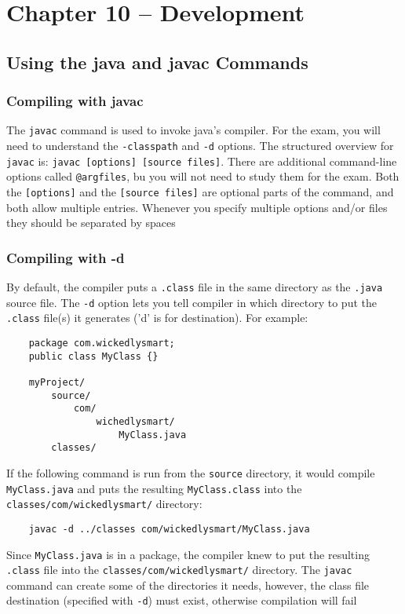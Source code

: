 \section{Chapter 10 -- Development}
\subsection{Using the java and javac Commands}
\subsubsection{Compiling with javac}
The \verb#javac# command is used to invoke java's compiler. For the exam, you 
will need to understand the \verb#-classpath# and \verb#-d# options. The 
structured overview for \verb#javac# is: \verb#javac [options] [source files]#.
There are additional command-line options called \verb#@argfiles#, bu you will 
not need to study them for the exam. Both the \verb#[options]# and the 
\verb#[source files]# are optional parts of the command, and both allow 
multiple entries. Whenever you specify multiple options and/or files they 
should be separated by spaces

\subsubsection{Compiling with -d}
By default, the compiler puts a \verb#.class# file in the same directory as the 
\verb#.java# source file. The \verb#-d# option lets you tell compiler in which 
directory to put the \verb#.class# file(s) it generates ('d' is for 
destination). For example:
\begin{verbatim}
    package com.wickedlysmart;
    public class MyClass {}

    myProject/
        source/
            com/
                wichedlysmart/
                    MyClass.java
        classes/
\end{verbatim}
If the following command is run from the \verb#source# directory, it would 
compile \verb#MyClass.java# and puts the resulting \verb#MyClass.class# into 
the \verb#classes/com/wickedlysmart/# directory:
\begin{verbatim}
    javac -d ../classes com/wickedlysmart/MyClass.java
\end{verbatim}
Since \verb#MyClass.java# is in a package, the compiler knew to put the 
resulting \verb#.class# file into the \verb#classes/com/wickedlysmart/# 
directory. The \verb#javac# command can create some of the directories it 
needs, however, the class file destination (specified with \verb#-d#) must 
exist, otherwise compilation will fail

